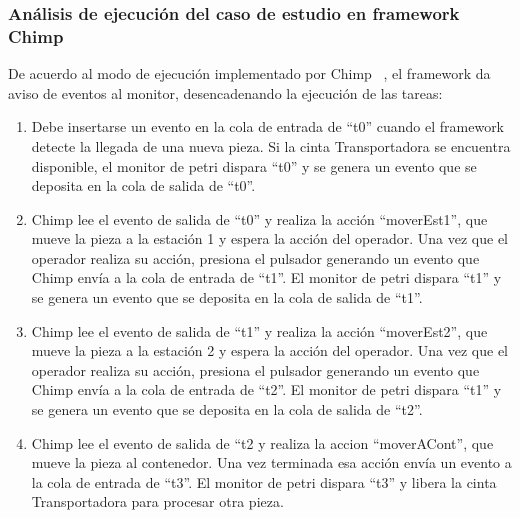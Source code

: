 \subsubsection{Análisis de ejecución del caso de estudio en framework Chimp} 
De acuerdo al modo de ejecución implementado por Chimp ~\cite{chimp}, el
framework da aviso de eventos al monitor, desencadenando la ejecución de las tareas:
\begin{enumerate}
    \item Debe insertarse un evento en la cola de entrada de “t0” cuando el framework
		detecte la llegada de una nueva pieza. Si la cinta Transportadora se encuentra
		disponible, el monitor de petri dispara “t0” y se genera un evento que se
		deposita en la cola de salida de “t0”.
    \item Chimp lee el evento de salida de “t0” y realiza la acción “moverEst1”, que
		mueve la pieza a la estación 1 y espera la acción del operador. Una vez que el
		operador realiza su acción, presiona el pulsador generando un evento que Chimp
		envía a la cola de  entrada de “t1”. El monitor de petri dispara “t1” y se
		genera un evento que se deposita en la cola de salida de “t1”.
    \item Chimp lee el evento de salida de “t1” y realiza la acción “moverEst2”, que
		mueve la pieza a la estación 2 y espera la acción del operador. Una vez que el
		operador realiza su acción, presiona el pulsador generando un evento que Chimp
		envía a la cola de  entrada de “t2”. El monitor de petri dispara “t1” y se
		genera un evento que se deposita en la cola de salida de “t2”.
    \item Chimp lee el evento de salida de “t2 y realiza la accion “moverACont”, que
		mueve la pieza al contenedor. Una vez terminada esa acción envía un evento a
		la cola de entrada de “t3”. El monitor de petri dispara “t3” y libera la
		cinta Transportadora para procesar otra pieza.
\end{enumerate}

